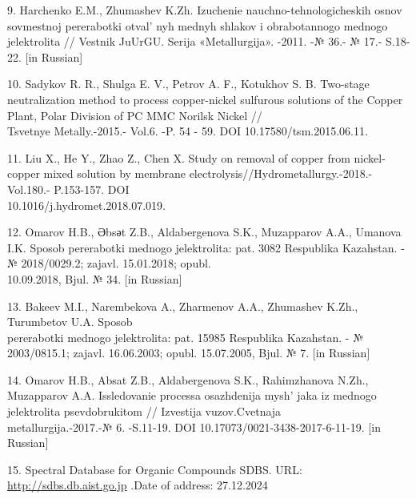 \begin{references}
9. Harchenko E.M., Zhumashev K.Zh. Izuchenie nauchno-tehnologicheskih
osnov sovmestnoj pererabotki otval' nyh mednyh shlakov i
obrabotannogo mednogo jelektrolita // Vestnik JuUrGU. Serija
«Metallurgija». -2011. -№ 36.- № 17.- S.18-22. {[}in Russian{]}

10. Sadykov R. R., Shulga E. V., Petrov A. F., Kotukhov S. B. Two-stage
neutralization method to process copper-nickel sulfurous solutions of
the Copper Plant, Polar Division of PC MMC Norilsk Nickel //\\Tsvetnye
Metally.-2015.- Vol.6. -P. 54 - 59. DOI 10.17580/tsm.2015.06.11.

11. Liu X., He Y., Zhao Z., Chen X. Study on removal of copper from
nickel-copper mixed solution by membrane
electrolysis//Hydrometallurgy.-2018.-Vol.180.- P.153-157.
DOI\\ 10.1016/j.hydromet.2018.07.019.

12. Omarov H.B., Әbsәt Z.B., Aldabergenova S.K., Muzapparov A.A., Umanova
I.K. Sposob pererabotki mednogo jelektrolita: pat. 3082 Respublika
Kazahstan. - № 2018/0029.2; zajavl. 15.01.2018; opubl. \\10.09.2018, Bjul.
№ 34. {[}in Russian{]}

13. Bakeev M.I., Narembekova A., Zharmenov A.A., Zhumashev K.Zh.,
Turumbetov U.A. Sposob \\pererabotki mednogo jelektrolita: pat. 15985
Respublika Kazahstan. - № 2003/0815.1; zajavl. 16.06.2003; opubl.
15.07.2005, Bjul. № 7. {[}in Russian{]}

14. Omarov H.B., Absat Z.B., Aldabergenova S.K., Rahimzhanova N.Zh.,
Muzapparov A.A. Issledovanie processa osazhdenija
mysh' jaka iz mednogo jelektrolita psevdobrukitom //
Izvestija vuzov.Cvetnaja \\metallurgija.-2017.-№ 6. -S.11-19. DOI
10.17073/0021-3438-2017-6-11-19. {[}in Russian{]}

15. Spectral Database for Organic Compounds SDBS. URL:
\href{http://sdbs.db.aist.go.jp/sdbs/cgi-bin/direct_frame_top.cgi}{http://sdbs.db.aist.go.jp} .Date
of address: 27.12.2024
\end{references}

